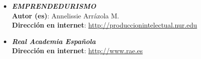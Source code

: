 \documentclass[12pt,letterpaper,titlepage]{article}
\begin{document}
\begin{itemize}
\item \textbf{\textit{EMPRENDEDURISMO}}\\
\textbf{Autor (es)}: Annelissie Arrázola M.\\
\textbf{Direcci\'on en internet}:  \href{http://produccionintelectual.nur.edu/archivos/emprendedurismo.pdf}{http://produccionintelectual.nur.edu}


\item \textbf{\textit{Real Academia Espa\~nola}}\\
\textbf{Direcci\'on en internet}: \href{http://www.rae.es}{http://www.rae.es}
\end{itemize}


% 
% 
\end{document}
